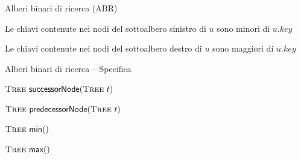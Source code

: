 \begin{frame}{Alberi binari di ricerca (ABR)}

\vspace{-9pt}
\begin{myboxtitle}[Proprietà]
\BEL
\item Le chiavi contenute nei nodi del \alert{sottoalbero sinistro} di $u$ sono \alert{minori} di $u.\mathit{key}$
\item Le chiavi contenute nei  nodi del \alert{sottoalbero destro} di $u$ sono \alert{maggiori} di $u.\mathit{key}$
\EEL
\end{myboxtitle}

\end{frame}

\begin{frame}{Alberi binari di ricerca -- Specifica}

\vspace{-12pt}

\begin{myboxtitle}[Ordinamento]
\BI
\item $\Tree\ \textsf{successorNode}(\Tree\ t)$
\item $\Tree\ \textsf{predecessorNode}(\Tree\ t)$
\item $\textsc{Tree}\ \textsf{min}()$
\item $\textsc{Tree}\ \textsf{max}()$
\EI
\end{myboxtitle}


\end{frame}

